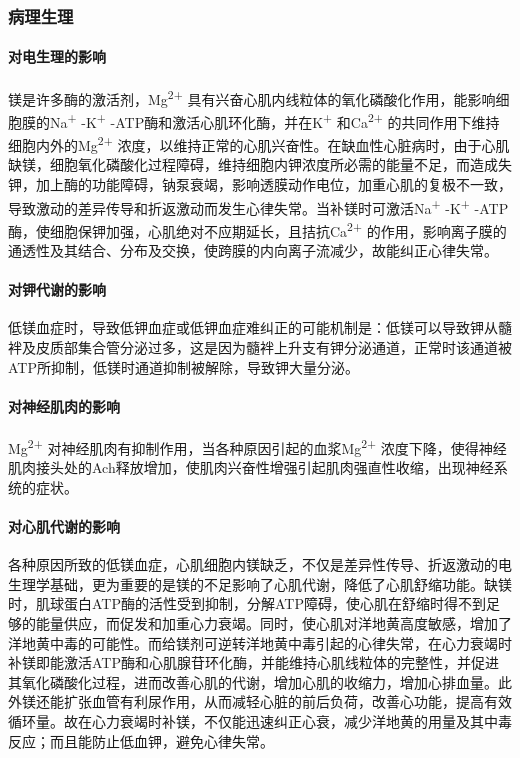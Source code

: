 \subsubsection{病理生理}

\paragraph{对电生理的影响}

镁是许多酶的激活剂，Mg\textsuperscript{2+}
具有兴奋心肌内线粒体的氧化磷酸化作用，能影响细胞膜的Na\textsuperscript{+}
-K\textsuperscript{+} -ATP酶和激活心肌环化酶，并在K\textsuperscript{+}
和Ca\textsuperscript{2+}
的共同作用下维持细胞内外的Mg\textsuperscript{2+}
浓度，以维持正常的心肌兴奋性。在缺血性心脏病时，由于心肌缺镁，细胞氧化磷酸化过程障碍，维持细胞内钾浓度所必需的能量不足，而造成失钾，加上酶的功能障碍，钠泵衰竭，影响透膜动作电位，加重心肌的复极不一致，导致激动的差异传导和折返激动而发生心律失常。当补镁时可激活Na\textsuperscript{+}
-K\textsuperscript{+}
-ATP酶，使细胞保钾加强，心肌绝对不应期延长，且拮抗Ca\textsuperscript{2+}
的作用，影响离子膜的通透性及其结合、分布及交换，使跨膜的内向离子流减少，故能纠正心律失常。

\paragraph{对钾代谢的影响}

低镁血症时，导致低钾血症或低钾血症难纠正的可能机制是：低镁可以导致钾从髓袢及皮质部集合管分泌过多，这是因为髓袢上升支有钾分泌通道，正常时该通道被ATP所抑制，低镁时通道抑制被解除，导致钾大量分泌。

\paragraph{对神经肌肉的影响}

Mg\textsuperscript{2+}
对神经肌肉有抑制作用，当各种原因引起的血浆Mg\textsuperscript{2+}
浓度下降，使得神经肌肉接头处的Ach释放增加，使肌肉兴奋性增强引起肌肉强直性收缩，出现神经系统的症状。

\paragraph{对心肌代谢的影响}

各种原因所致的低镁血症，心肌细胞内镁缺乏，不仅是差异性传导、折返激动的电生理学基础，更为重要的是镁的不足影响了心肌代谢，降低了心肌舒缩功能。缺镁时，肌球蛋白ATP酶的活性受到抑制，分解ATP障碍，使心肌在舒缩时得不到足够的能量供应，而促发和加重心力衰竭。同时，使心肌对洋地黄高度敏感，增加了洋地黄中毒的可能性。而给镁剂可逆转洋地黄中毒引起的心律失常，在心力衰竭时补镁即能激活ATP酶和心肌腺苷环化酶，并能维持心肌线粒体的完整性，并促进其氧化磷酸化过程，进而改善心肌的代谢，增加心肌的收缩力，增加心排血量。此外镁还能扩张血管有利尿作用，从而减轻心脏的前后负荷，改善心功能，提高有效循环量。故在心力衰竭时补镁，不仅能迅速纠正心衰，减少洋地黄的用量及其中毒反应；而且能防止低血钾，避免心律失常。


